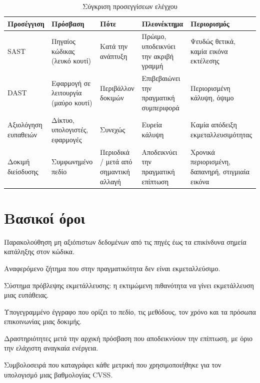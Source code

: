 \documentclass[11pt,openany]{book}
\begin{document}
\begin{table}[htbp]
  \centering\small
  \caption{Σύγκριση προσεγγίσεων ελέγχου}
  \begin{tabularx}{\linewidth}{>{\raggedright\arraybackslash}X >{\raggedright\arraybackslash}X >{\raggedright\arraybackslash}X >{\raggedright\arraybackslash}X >{\raggedright\arraybackslash}X}
    \toprule
    \textbf{Προσέγγιση} & \textbf{Πρόσβαση} & \textbf{Πότε} & \textbf{Πλεονέκτημα} & \textbf{Περιορισμός} \\
    \midrule
    SAST & Πηγαίος κώδικας (λευκό κουτί) & Κατά την ανάπτυξη & Πρώιμο, υποδεικνύει την ακριβή γραμμή & Ψευδώς θετικά, καμία εικόνα εκτέλεσης \\
    DAST & Εφαρμογή σε λειτουργία (μαύρο κουτί) & Περιβάλλον δοκιμών & Επιβεβαιώνει την πραγματική συμπεριφορά & Περιορισμένη κάλυψη, όψιμο \\
    Αξιολόγηση ευπαθειών & Δίκτυο, υπολογιστές, εφαρμογές & Συνεχώς & Ευρεία κάλυψη & Καμία απόδειξη εκμεταλλευσιμότητας \\
    Δοκιμή διείσδυσης & Συμφωνημένο πεδίο & Περιοδικά / μετά από σημαντική αλλαγή & Αποδεικνύει την πραγματική επίπτωση & Χρονικά περιορισμένη, δαπανηρή, στιγμιαία εικόνα \\
    \bottomrule
  \end{tabularx}
\end{table}
\section*{Βασικοί όροι}
\begin{description}[style=nextline,leftmargin=1.2em]
  \item[Ανάλυση μόλυνσης] Παρακολούθηση μη αξιόπιστων δεδομένων από τις πηγές έως τα επικίνδυνα σημεία κατάληξης στον κώδικα.
  \item[Ψευδώς θετικό] Αναφερόμενο ζήτημα που στην πραγματικότητα δεν είναι εκμεταλλεύσιμο.
  \item[EPSS] Σύστημα πρόβλεψης εκμετάλλευσης: η εκτιμώμενη πιθανότητα να γίνει εκμετάλλευση μιας ευπάθειας.
  \item[Κανόνες εμπλοκής] Υπογεγραμμένο έγγραφο που ορίζει το πεδίο, τις μεθόδους, τον χρόνο και τα πρόσωπα επικοινωνίας μιας δοκιμής.
  \item[Μετά την εκμετάλλευση] Δραστηριότητες μετά την αρχική πρόσβαση που αποδεικνύουν την επίπτωση, με όριο την ελάχιστη αναγκαία ενέργεια.
  \item[Διάνυσμα CVSS] Συμβολοσειρά που καταγράφει κάθε μετρική που χρησιμοποιήθηκε για τον υπολογισμό μιας βαθμολογίας CVSS.
\end{description}
\end{document}
